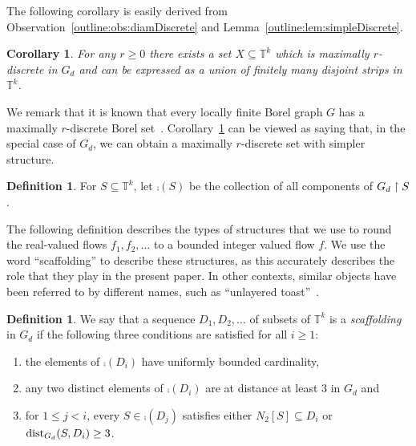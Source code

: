 \documentclass[12pt,a4paper]{amsart}
\numberwithin{equation}{section}
\newtheorem{corollary}[equation]{Corollary}
\theoremstyle{definition}
\newtheorem{defn}[equation]{Definition}
\begin{document}
The following corollary is easily derived from Observation~\ref{outline:obs:diamDiscrete} and Lemma~\ref{outline:lem:simpleDiscrete}.

\begin{corollary}
\label{outline:cor:stripDiscrete}
For any $r\geq0$ there exists a set $X\subseteq \mathbb{T}^k$ which is maximally $r$-discrete in $G_d$ and can be expressed as a union of finitely many disjoint strips in $\mathbb{T}^k$. 
\end{corollary}

We remark that it is known that every locally finite Borel graph $G$ has a maximally $r$-discrete Borel set~\cite[Theorem~4.2]{KechrisSoleckiTodorcevic99}. Corollary~\ref{outline:cor:stripDiscrete} can be viewed as saying that, in the special case of $G_d$, we can obtain a maximally $r$-discrete set with simpler structure. 

\begin{defn}
For $S\subseteq \mathbb{T}^k$, let $\comp(S)$ be the collection of all components of $G_d\upharpoonright S$. 
\end{defn}

The following definition describes the types of structures that we use to round the real-valued flows $f_1,f_2,\dots$ to a bounded integer valued flow $f$. We use the word ``scaffolding'' to describe these structures, as this accurately describes the role that they play in the present paper. In other contexts, similar objects have been referred to by different names, such as ``unlayered toast''~\cite[Definition~4.1]{GaoJacksonKrohneSeward15}. 

\begin{defn}
\label{def:scaff}
We say that a sequence $D_1,D_2,\dots$ of subsets of $\mathbb{T}^k$ is a \emph{scaffolding} in $G_d$ if the following three conditions are satisfied for all $i\geq1$:
\begin{enumerate}
\item\label{scaffBdd} the elements of $\comp(D_i)$ have uniformly bounded cardinality,
\item\label{scaffDist} any two distinct elements of $\comp(D_i)$ are at distance at least $3$ in $G_d$ and
\item\label{scaffUt} for $1\leq j<i$, every $S\in \comp(D_j)$ satisfies either $N_2[S]\subseteq D_i$ or $\operatorname{dist}_{G_d}(S,D_i)\geq 3$.
\end{enumerate}
\end{defn}
\end{document}
